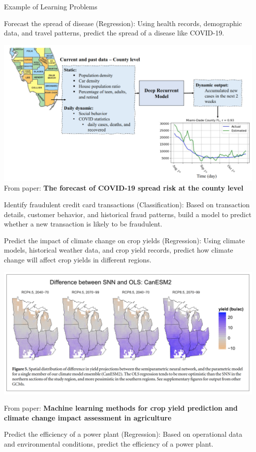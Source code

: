 \documentclass[aspectratio=169,xcolor=dvipsnames,svgnames,x11names,fleqn]{beamer}
\begin{document}
\begin{frame}{Example of Learning Problems}
\begin{itemize}
     {\item Forecast the spread of disease (Regression): Using health records, demographic data, and travel patterns, predict the spread of a disease like COVID-19.
    \begin{center}
      \includegraphics[width=0.6\linewidth]{figures/COVID_Forecast.png}
      {\tiny From paper: \bf The forecast of COVID‑19 spread risk
      at the county level}
    \end{center}
    }
     {\item Identify fraudulent credit card transactions (Classification): Based on transaction details, customer behavior, and historical fraud patterns, build a model to predict whether a new transaction is likely to be fraudulent.}
     {\item Predict the impact of climate change on crop yields (Regression): Using climate models, historical weather data, and crop yield records, predict how climate change will affect crop yields in different regions.
    \begin{center}
      \includegraphics[width=0.6\linewidth]{figures/crop_yield.png}

      {\tiny From paper: \bf Machine learning methods for crop yield prediction and climate change impact assessment in agriculture}
    \end{center}
    }
     {\item Predict the efficiency of a power plant (Regression): Based on operational data and environmental conditions, predict the efficiency of a power plant.}


\end{itemize}
\end{frame}
\end{document}
